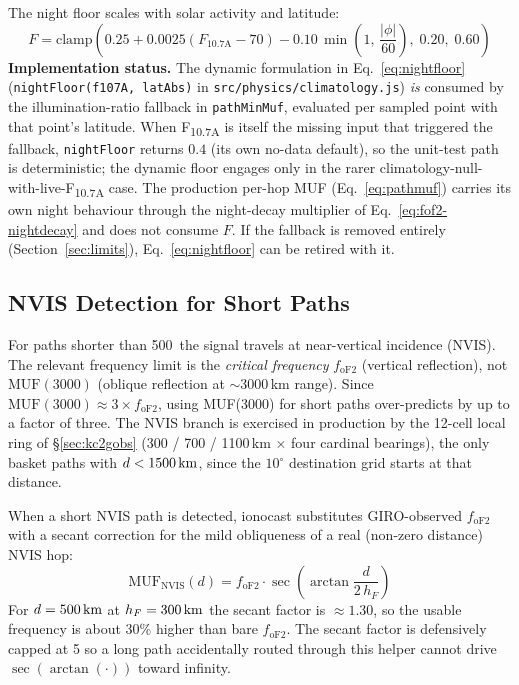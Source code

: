\documentclass[11pt,a4paper]{article}
\newcommand{\SI}[2]{#1\,\text{#2}}
\newcommand{\km}{\text{km}}
\newcommand{\degree}{\ensuremath{{}^\circ}}
\begin{document}
The night floor scales with solar activity and latitude:
\begin{equation}\label{eq:nightfloor}
  F = \text{clamp}\!\left(
    0.25 + 0.0025(F_{10.7\text{A}} - 70)
         - 0.10\,\min\!\left(1,\,\frac{|\phi|}{60}\right),\;
    0.20,\; 0.60
  \right)
\end{equation}
\textbf{Implementation status.}  The dynamic
formulation in Eq.~\ref{eq:nightfloor}
(\texttt{nightFloor(f107A, latAbs)} in
\texttt{src/physics/climatology.js}) \emph{is} consumed by the
illumination-ratio fallback in \texttt{pathMinMuf},
evaluated per sampled point with that point's latitude.  When
F\textsubscript{10.7A} is itself the missing input that
triggered the fallback, \texttt{nightFloor} returns $0.4$ (its
own no-data default), so the unit-test path is
deterministic; the dynamic floor engages only in the rarer
climatology-null-with-live-F\textsubscript{10.7A} case.  The
production per-hop MUF (Eq.~\ref{eq:pathmuf}) carries its own
night behaviour through the night-decay multiplier of
Eq.~\ref{eq:fof2-nightdecay} and does not consume $F$.  If the
fallback is removed entirely
(Section~\ref{sec:limits}), Eq.~\ref{eq:nightfloor} can be
retired with it.

\subsection{NVIS Detection for Short Paths}\label{sec:nvisdetect}

For paths shorter than \SI{500}{\km} the signal travels at
near-vertical incidence (NVIS).  The relevant frequency limit is
the \emph{critical frequency} $f_{\text{oF2}}$ (vertical reflection),
not $\text{MUF}(3000)$ (oblique reflection at $\sim$3000\,km range).
Since $\text{MUF}(3000) \approx 3 \times f_{\text{oF2}}$, using
MUF(3000) for short paths over-predicts by up to a factor of three.
The NVIS branch is exercised in production by the 12-cell local
ring of \S\ref{sec:kc2gobs} (300 / 700 / 1100\,km $\times$ four
cardinal bearings), the only basket paths with $d <
\SI{1500}{\km}$, since the $10\degree$ destination grid starts at
that distance.

When a short NVIS path is detected, ionocast substitutes GIRO-observed
$f_{\text{oF2}}$ with a secant correction for the mild obliqueness of
a real (non-zero distance) NVIS hop:
\begin{equation}\label{eq:nvis}
  \text{MUF}_{\text{NVIS}}(d) = f_{\text{oF2}} \cdot
    \sec\!\left(\arctan\!\frac{d}{2\,h_F}\right)
\end{equation}
For $d = \SI{500}{\km}$ at $h_F = \SI{300}{\km}$ the secant factor
is $\approx 1.30$, so the usable frequency is about 30\% higher
than bare $f_{\text{oF2}}$.  The secant factor is defensively
capped at 5 so a long path accidentally routed through this
helper cannot drive $\sec(\arctan(\cdot))$ toward infinity.
\end{document}
